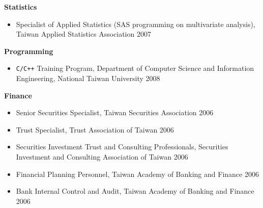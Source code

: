 \documentclass[]{res}
\begin{document}
\begin{resume}
		      {\bf Statistics}     \hfill
		      \begin{itemize} \itemsep -2pt
		      \item Specialist of Applied Statistics (SAS programming on multivariate analysis), Taiwan Applied Statistics Association \hfill 2007
		      \end{itemize}
              {\bf Programming}     \hfill		       
		      \begin{itemize} \itemsep -2pt
		      \item \texttt{C/C++} Training Program, Department of Computer Science and Information Engineering, National Taiwan University \hfill 2008
		      \end{itemize}
		      {\bf Finance}        
	          \begin{itemize} \itemsep -2pt
		      \item Senior Securities Specialist, Taiwan Securities Association  \hfill 2006
		      \item Trust Specialist, Trust Association of Taiwan \hfill 2006
		      \item Securities Investment Trust and Consulting Professionals, Securities Investment and Consulting Association of Taiwan \hfill 2006
		      \item Financial Planning Personnel, Taiwan Academy of Banking and Finance \hfill 2006
		      \item Bank Internal Control and Audit, Taiwan Academy of Banking and Finance \hfill 2006       
		      \end{itemize}	      


\end{resume}
\end{document}
